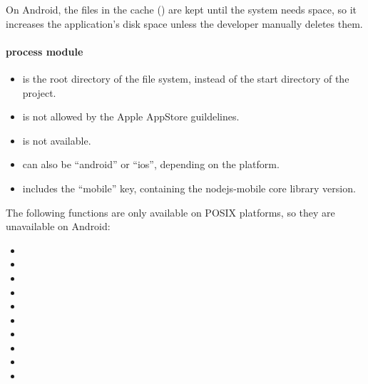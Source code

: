 On Android, the files in the cache () are kept until the system needs space, so it increases the application's disk space unless the developer manually deletes them.

\newpage

\paragraph{process module}

\begin{itemize}
  \setlength\itemsep{-0.5em}
  \item {} is the root directory of the file system, instead of the start directory of the project.
  \item {} is not allowed by the Apple AppStore guildelines.
  \item {} is not available.
  \item {} can also be \enquote{android} or \enquote{ios}, depending on the platform.
  \item {} includes the \enquote{mobile} key, containing the nodejs-mobile core library version.
\end{itemize}

The following functions are only available on POSIX platforms, so they are unavailable on Android:

\begin{itemize}
  \setlength\itemsep{-0.8em}
  \item {}
  \item {}
  \item {}
  \item {}
  \item {}
  \item {}
  \item {}
  \item {}
  \item {}
  \item {}
\end{itemize}
